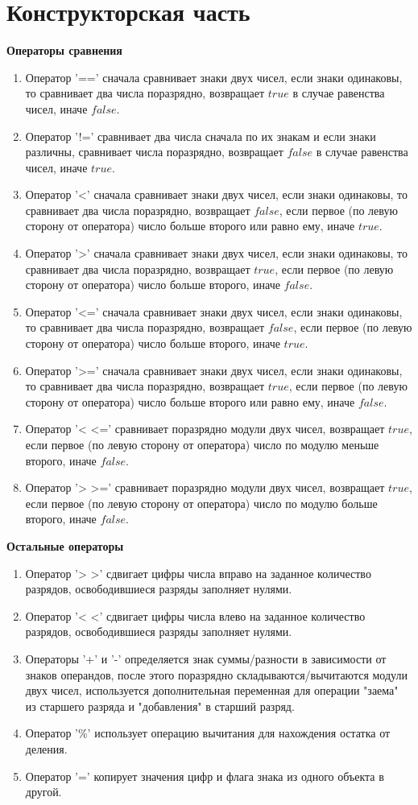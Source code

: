 \documentclass[12pt, a4paper]{article}
\begin{document}
\section{Конструкторская часть}
\textbf{Операторы сравнения}
\begin{enumerate}
	\item Оператор '==' сначала сравнивает знаки двух чисел, если знаки 
	одинаковы, то сравнивает два числа поразрядно, возвращает $true$ в 
	случае равенства чисел, иначе $false$.
	\item Оператор '!=' сравнивает два числа сначала по их знакам 
	и если знаки различны, сравнивает числа поразрядно, возвращает 
	$false$ в случае равенства чисел, иначе $true$.
	\item Оператор '<' сначала сравнивает знаки двух чисел, если знаки 
	одинаковы, то сравнивает два числа поразрядно, возвращает $false$, 
	если первое (по левую сторону от оператора) число больше второго или 
	равно ему, иначе $true$.
	\item Оператор '>' сначала сравнивает знаки двух чисел, если знаки 
	одинаковы, то сравнивает два числа поразрядно, возвращает $true$, 
	если первое (по левую сторону от оператора) число больше второго, 
	иначе $false$.
	\item Оператор '<=' сначала сравнивает знаки двух чисел, если знаки 
	одинаковы, то сравнивает два числа поразрядно, возвращает $false$, 
	если первое (по левую сторону от оператора) число больше второго, 
	иначе $true$.
	\item Оператор '>=' сначала сравнивает знаки двух чисел, если знаки 
	одинаковы, то сравнивает два числа поразрядно, возвращает $true$, 
	если первое (по левую сторону от оператора) число больше второго или 
	равно ему, иначе $false$.
	\item Оператор '< <=' сравнивает поразрядно модули двух чисел, 
	возвращает $true$, если первое (по левую сторону от оператора) число 
	по модулю меньше второго, иначе $false$.
	\item Оператор '> >=' сравнивает поразрядно модули двух чисел, 
	возвращает $true$, если первое (по левую сторону от оператора) число 
	по модулю больше второго, иначе $false$.
\end{enumerate}
\textbf{Остальные операторы}
\begin{enumerate}
	\item Оператор '> >' сдвигает цифры числа вправо на заданное 
	количество разрядов, освободившиеся разряды заполняет нулями.
	\item Оператор '< <' сдвигает цифры числа влево на заданное 
	количество разрядов, освободившиеся разряды заполняет нулями.
	\item Операторы '+' и '-' определяется знак суммы/разности в 
	зависимости от знаков операндов, после этого поразрядно 
	складываются/вычитаются модули двух чисел, используется 
	дополнительная переменная для операции "заема" из старшего 
	разряда и "добавления" в старший разряд.
	\item Оператор '\%' использует операцию вычитания для нахождения 
	остатка от деления.
	\item Оператор '=' копирует значения цифр и флага знака из одного 
	объекта в другой.
\end{enumerate}
\end{document}
